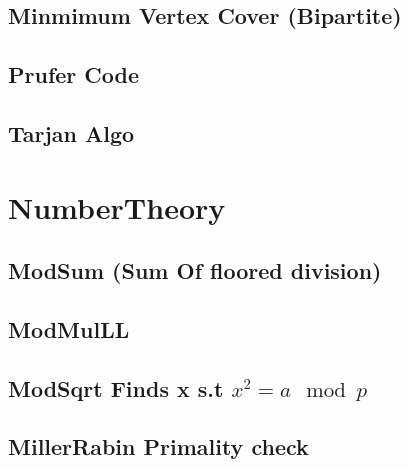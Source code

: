 \subsection{Minmimum Vertex Cover (Bipartite)}
\vspace{-2ex}
\raggedbottom
\vspace{-3.2ex}
\hrulefill
\subsection{Prufer Code}
\vspace{-2ex}
\raggedbottom
\vspace{-3.2ex}
\hrulefill
\subsection{Tarjan Algo}
\vspace{-2ex}
\raggedbottom
\vspace{-3.2ex}
\hrulefill

\section{NumberTheory}
\subsection{ModSum (Sum Of floored division)}
\vspace{-2ex}
\raggedbottom
\vspace{-3.2ex}
\hrulefill
\subsection{ModMulLL}
\vspace{-2ex}
\raggedbottom
\vspace{-3.2ex}
\hrulefill
\subsection{ModSqrt Finds x s.t ${x^2 = a \mod p}$}
\vspace{-2ex}
\raggedbottom
\vspace{-3.2ex}
\hrulefill
\subsection{MillerRabin Primality check}
\vspace{-2ex}
\raggedbottom
\vspace{-3.2ex}
\hrulefill

